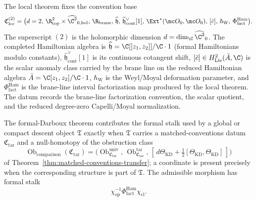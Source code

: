 \begin{defn}\label{defn:local-hamiltonian-convention-base}
  The local theorem fixes the convention base
  \[
  \mathfrak C_{\mathrm{loc}}^{(2)}=
  \bigl(
    d=2,\,
    \R^2_{\mathrm{top}}\times\widehat{\C^2}_{0,\mathrm{hol}},\,
    \R_{\mathrm{brane}},\,
    \widehat{\mathfrak h},\,
    \widehat{\mathfrak h}^{\vee}_{\mathrm{cont}}[1],\,
    \Ext^*(\mc O_0,\mc O_0),\,
    [\bar c],\,
    \hbar_{\mathrm{W}},\,
    \Phi^{\mathrm{Ham}}_{\mathrm{fact}}
  \bigr).
  \]
  The superscript \((2)\) is the holomorphic dimension
  \(d=\dim_\C\widehat{\C^2}_0\).  The completed Hamiltonian algebra is
  \(\widehat{\mathfrak h}=\C[[z_1,z_2]]/\C\cdot 1\) (formal Hamiltonians
  modulo constants), \(\widehat{\mathfrak h}^{\vee}_{\mathrm{cont}}[1]\)
  is its continuous cotangent shift, \([\bar c]\in
  H^2_{\mathrm{Lie}}(\bar A,\C)\) is the scalar anomaly class
  carried by the brane line on the reduced Hamiltonian algebra
  \(\bar A=\C[z_1,z_2]/\C\cdot1\), \(\hbar_{\mathrm{W}}\) is the
  Weyl/Moyal deformation parameter, and
  \(\Phi^{\mathrm{Ham}}_{\mathrm{fact}}\) is the brane-line interval
  factorization map produced by the local theorem.  The datum records
  the brane-line factorization convention, the scalar quotient, and the
  reduced degree-zero Capelli/Moyal normalization.
\end{defn}

\begin{lem}\label{lem:formal-disk-transfer-obstruction}
  The formal-Darboux theorem contributes the formal stalk used by a global
  or compact descent object \(\mathfrak T\) exactly when
  \(\mathfrak T\) carries a matched-conventions datum
  \(\mathfrak C_{\mathrm{tar}}\) and a null-homotopy of the obstruction
  class
  \[
    \operatorname{Ob}_{\mathrm{comparison}}(\mathfrak C_{\mathrm{tar}})
    =
    \bigl(
      \operatorname{Ob}_{\mathfrak C_{\mathrm{tar}}}^{\mathrm{univ}},\,
      \operatorname{Ob}_{\mathfrak C_{\mathrm{tar}}}^{\mathrm{tar}},\,
      [\,d\Theta_{\mathrm{KD}}+\tfrac12
       [\Theta_{\mathrm{KD}},\Theta_{\mathrm{KD}}]\,]
    \bigr)
  \]
  of Theorem~\ref{thm:matched-conventions-transfer}; a coordinate is
  present precisely when the corresponding structure is part of
  \(\mathfrak T\).  The admissible morphism has formal stalk
  \[
    \chi_{\mathrm{op}}^{-1}
    \Phi^{\mathrm{Ham}}_{\mathrm{fact}}
    \chi_{\mathrm{cl}}.
  \]
\end{lem}

